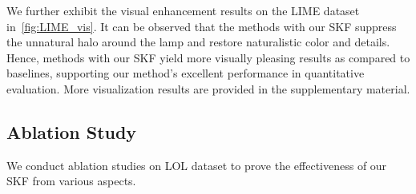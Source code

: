 \documentclass[10pt,twocolumn,letterpaper]{article}
\begin{document}
\begin{table}[ht]
  \centering
    \setlength{\abovecaptionskip}{0.15cm}
\caption{Ablation study for investigating whether the performance improvement comes from semantic priors or more parameters.}
  \label{tab:ablation_msa}\vspace{-0.6cm}
\end{table}

We further exhibit the visual enhancement results on the LIME dataset in~\cref{fig:LIME_vis}. It can be observed that the methods with our SKF suppress the unnatural halo around the lamp and restore naturalistic color and details. Hence, methods with our SKF yield more visually pleasing results as compared to baselines, supporting our method's excellent performance in quantitative evaluation. More visualization results are provided in the \textcolor[rgb]{0.75,0.16,0.26}{supplementary material}.

\vspace{-0.2cm}
\subsection{Ablation Study}
\vspace{-0.2cm}
We conduct ablation studies on LOL dataset to prove the effectiveness of our SKF from various aspects. 
\end{document}
